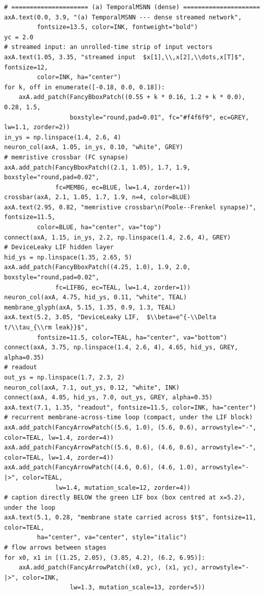 \begin{lstlisting}[caption={experiments/temporal\_storerecall.ipynb},label={lst:mnn-nb-temporal-storerecall}]
# ===================== (a) TemporalMSNN (dense) =====================
axA.text(0.0, 3.9, "(a) TemporalMSNN --- dense streamed network",
         fontsize=13.5, color=INK, fontweight="bold")
yc = 2.0
# streamed input: an unrolled-time strip of input vectors
axA.text(1.05, 3.35, "streamed input  $x[1],\\,x[2],\\dots,x[T]$", fontsize=12,
         color=INK, ha="center")
for k, off in enumerate([-0.18, 0.0, 0.18]):
    axA.add_patch(FancyBboxPatch((0.55 + k * 0.16, 1.2 + k * 0.0), 0.28, 1.5,
                  boxstyle="round,pad=0.01", fc="#f4f6f9", ec=GREY, lw=1.1, zorder=2))
in_ys = np.linspace(1.4, 2.6, 4)
neuron_col(axA, 1.05, in_ys, 0.10, "white", GREY)
# memristive crossbar (FC synapse)
axA.add_patch(FancyBboxPatch((2.1, 1.05), 1.7, 1.9, boxstyle="round,pad=0.02",
              fc=MEMBG, ec=BLUE, lw=1.4, zorder=1))
crossbar(axA, 2.1, 1.05, 1.7, 1.9, n=4, color=BLUE)
axA.text(2.95, 0.82, "memristive crossbar\n(Poole--Frenkel synapse)", fontsize=11.5,
         color=BLUE, ha="center", va="top")
connect(axA, 1.15, in_ys, 2.2, np.linspace(1.4, 2.6, 4), GREY)
# DeviceLeaky LIF hidden layer
hid_ys = np.linspace(1.35, 2.65, 5)
axA.add_patch(FancyBboxPatch((4.25, 1.0), 1.9, 2.0, boxstyle="round,pad=0.02",
              fc=LIFBG, ec=TEAL, lw=1.4, zorder=1))
neuron_col(axA, 4.75, hid_ys, 0.11, "white", TEAL)
membrane_glyph(axA, 5.15, 1.35, 0.9, 1.3, TEAL)
axA.text(5.2, 3.05, "DeviceLeaky LIF,  $\\beta=e^{-\\Delta t/\\tau_{\\rm leak}}$",
         fontsize=11.5, color=TEAL, ha="center", va="bottom")
connect(axA, 3.75, np.linspace(1.4, 2.6, 4), 4.65, hid_ys, GREY, alpha=0.35)
# readout
out_ys = np.linspace(1.7, 2.3, 2)
neuron_col(axA, 7.1, out_ys, 0.12, "white", INK)
connect(axA, 4.85, hid_ys, 7.0, out_ys, GREY, alpha=0.35)
axA.text(7.1, 1.35, "readout", fontsize=11.5, color=INK, ha="center")
# recurrent membrane-across-time loop (compact, under the LIF block)
axA.add_patch(FancyArrowPatch((5.6, 1.0), (5.6, 0.6), arrowstyle="-", color=TEAL, lw=1.4, zorder=4))
axA.add_patch(FancyArrowPatch((5.6, 0.6), (4.6, 0.6), arrowstyle="-", color=TEAL, lw=1.4, zorder=4))
axA.add_patch(FancyArrowPatch((4.6, 0.6), (4.6, 1.0), arrowstyle="-|>", color=TEAL,
              lw=1.4, mutation_scale=12, zorder=4))
# caption directly BELOW the green LIF box (box centred at x=5.2), under the loop
axA.text(5.1, 0.28, "membrane state carried across $t$", fontsize=11, color=TEAL,
         ha="center", va="center", style="italic")
# flow arrows between stages
for x0, x1 in [(1.25, 2.05), (3.85, 4.2), (6.2, 6.95)]:
    axA.add_patch(FancyArrowPatch((x0, yc), (x1, yc), arrowstyle="-|>", color=INK,
                  lw=1.3, mutation_scale=13, zorder=5))


\end{lstlisting}
